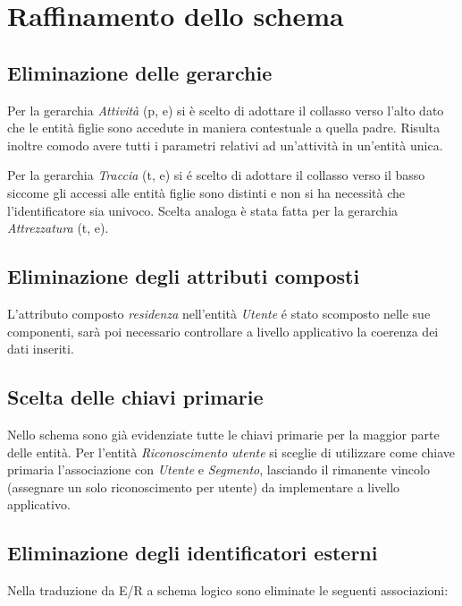 \documentclass[12pt]{report}
\begin{document}
\newpage
\section{Raffinamento dello schema}

\subsection*{Eliminazione delle gerarchie}

Per la gerarchia \emph{Attività} (p, e) si è scelto di adottare il collasso verso l'alto dato che le
entità figlie sono accedute in maniera contestuale a quella padre. Risulta inoltre comodo avere
tutti i parametri relativi ad un'attività in un'entità unica. 

Per la gerarchia \emph{Traccia} (t, e) si é scelto di adottare il collasso verso il basso siccome gli
accessi alle entità figlie sono distinti e non si ha necessità che l'identificatore sia univoco.
Scelta analoga è stata fatta per la gerarchia \emph{Attrezzatura} (t, e).

\subsection*{Eliminazione degli attributi composti}

L'attributo composto \emph{residenza} nell'entità \emph{Utente} é stato scomposto nelle sue 
componenti, sarà poi necessario controllare a livello applicativo la coerenza dei dati inseriti.

\subsection*{Scelta delle chiavi primarie}

Nello schema sono già evidenziate tutte le chiavi primarie per la maggior
parte delle entità. Per l'entità \emph{Riconoscimento utente} si sceglie di utilizzare come chiave
primaria l'associazione con \emph{Utente} e \emph{Segmento}, lasciando il rimanente vincolo (assegnare
un solo riconoscimento per utente) da implementare a livello applicativo.

\subsection*{Eliminazione degli identificatori esterni}
Nella traduzione da E/R a schema logico sono eliminate le seguenti associazioni:
\end{document}
